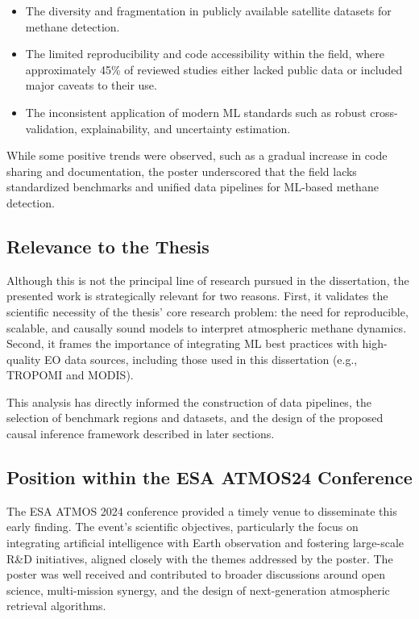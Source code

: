 
\begin{itemize}
    \item The diversity and fragmentation in publicly available satellite datasets for methane detection.
    \item The limited reproducibility and code accessibility within the field, where approximately 45\% of reviewed studies either lacked public data or included major caveats to their use.
    \item The inconsistent application of modern ML standards such as robust cross-validation, explainability, and uncertainty estimation.
\end{itemize}

While some positive trends were observed, such as a gradual increase in code sharing and documentation, the poster underscored that the field lacks standardized benchmarks and unified data pipelines for ML-based methane detection.

\subsection{Relevance to the Thesis}

Although this is not the principal line of research pursued in the dissertation, the presented work is strategically relevant for two reasons. First, it validates the scientific necessity of the thesis’ core research problem: the need for reproducible, scalable, and causally sound models to interpret atmospheric methane dynamics. Second, it frames the importance of integrating ML best practices with high-quality EO data sources, including those used in this dissertation (e.g., TROPOMI and MODIS). 

This analysis has directly informed the construction of data pipelines, the selection of benchmark regions and datasets, and the design of the proposed causal inference framework described in later sections.

\subsection{Position within the ESA ATMOS24 Conference}

The ESA ATMOS 2024 conference provided a timely venue to disseminate this early finding. The event’s scientific objectives, particularly the focus on integrating artificial intelligence with Earth observation and fostering large-scale R\&D initiatives, aligned closely with the themes addressed by the poster. The poster was well received and contributed to broader discussions around open science, multi-mission synergy, and the design of next-generation atmospheric retrieval algorithms.

